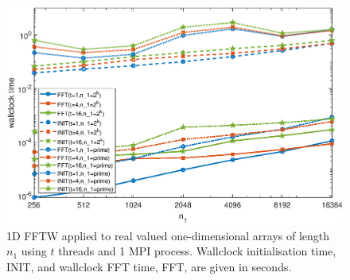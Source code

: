 \documentclass[a4]{article}
\begin{document}
\begin{figure}[!htbp]
\begin{center}
 \includegraphics[width=.9\textwidth, height=0.42\textheight]{FFTW1D_threads_times_fig.eps}
\caption{1D FFTW applied to real valued one-dimensional arrays of length $n_1$ using $t$ threads and 1 MPI process. Wallclock initialisation time, INIT, and wallclock FFT time, FFT, are given in seconds.}
\label{Fig:fftw1d_threads_times}
\end{center}
\end{figure}




\end{document}
